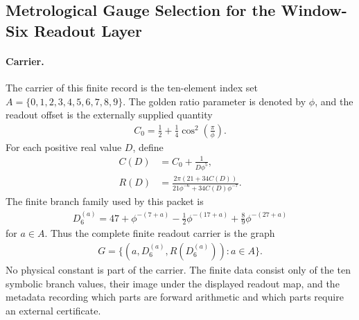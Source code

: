 
\subsection{Metrological Gauge Selection for the Window-Six Readout Layer}
\label{sec:window6-alpha-external-gauge-metrological-gauge-selection}

\paragraph{Carrier.}
The carrier of this finite record is the ten-element index set $A=\{0,1,2,3,4,5,6,7,8,9\}$.  The golden ratio parameter is denoted by $\phi$, and the readout offset is the externally supplied quantity
$$
\begin{aligned}
C_0=\frac{1}{2}+\frac{1}{4}\cos^2\left(\frac{\pi}{\phi}\right).
\end{aligned}
$$
For each positive real value $D$, define
$$
\begin{aligned}
C(D)&=C_0+\frac{1}{D\phi^5},\\
R(D)&=\frac{2\pi(21+34C(D))}{21\phi^{-6}+34C(D)\phi^{-7}}.
\end{aligned}
$$
The finite branch family used by this packet is
$$
\begin{aligned}
D_6^{(a)}=47+\phi^{-(7+a)}-\frac{1}{2}\phi^{-(17+a)}+\frac{8}{9}\phi^{-(27+a)}
\end{aligned}
$$
for $a\in A$.  Thus the complete finite readout carrier is the graph
$$
\begin{aligned}
G=\{(a,D_6^{(a)},R(D_6^{(a)})):a\in A\}.
\end{aligned}
$$
No physical constant is part of the carrier.  The finite data consist only of the ten symbolic branch values, their image under the displayed readout map, and the metadata recording which parts are forward arithmetic and which parts require an external certificate.

